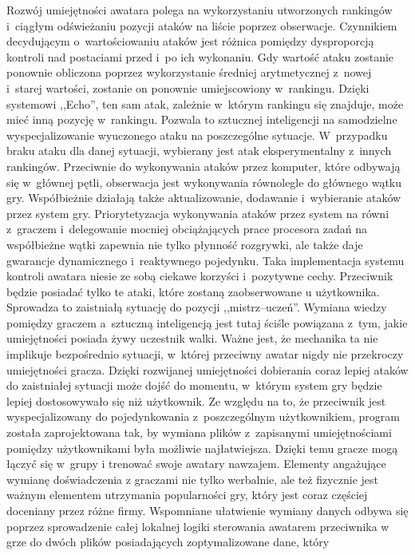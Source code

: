 \documentclass[brudnopis]{xmgr}
\begin{document}
Rozwój umiejętności awatara polega na wykorzystaniu utworzonych rankingów i~ciągłym
odświeżaniu pozycji ataków na liście poprzez obserwacje.
Czynnikiem decydującym o~wartościowaniu ataków jest różnica
pomiędzy dysproporcją kontroli nad postaciami przed i~po ich wykonaniu.
Gdy wartość ataku zostanie ponownie obliczona poprzez wykorzystanie
średniej arytmetycznej z~nowej i~starej wartości, zostanie on ponownie
umiejscowiony w~rankingu.
Dzięki systemowi ,,Echo'', ten sam atak, zależnie w~którym rankingu się
znajduje, może mieć inną pozycję w~rankingu. Pozwala to sztucznej
inteligencji na samodzielne wyspecjalizowanie wyuczonego ataku na
poszczególne sytuacje. W~przypadku braku ataku dla danej sytuacji,
wybierany jest atak eksperymentalny z~innych rankingów.
Przeciwnie do wykonywania ataków przez komputer, które odbywają się w~głównej
pętli, obserwacja jest wykonywania równolegle do głównego wątku gry.
Współbieżnie działają także aktualizowanie, dodawanie i~wybieranie ataków
przez system gry. Priorytetyzacja wykonywania ataków przez system
na równi z~graczem i~delegowanie mocniej obciążających prace procesora
zadań na współbieżne wątki zapewnia nie tylko płynność rozgrywki, ale
także daje gwarancje dynamicznego i~reaktywnego
pojedynku.
Taka implementacja systemu kontroli awatara niesie ze sobą ciekawe korzyści i~pozytywne cechy.
Przeciwnik będzie posiadać tylko te ataki, które zostaną zaobserwowane u użytkownika.
Sprowadza to zaistniałą sytuację do pozycji ,,mistrz--uczeń''. Wymiana
wiedzy pomiędzy graczem a~sztuczną inteligencją jest tutaj ściśle
powiązana z~tym, jakie umiejętności posiada żywy uczestnik walki. Ważne jest,
że mechanika ta nie implikuje bezpośrednio sytuacji, w~której przeciwny awatar nigdy nie
przekroczy umiejętności gracza. Dzięki rozwijanej umiejętności
dobierania coraz lepiej ataków do zaistniałej
sytuacji może dojść do momentu, w~którym system gry będzie lepiej
dostosowywało się niż użytkownik.
Ze względu na to, że przeciwnik jest wyspecjalizowany do
pojedynkowania z~poszczególnym użytkownikiem, program została zaprojektowana tak,
by wymiana plików z~zapisanymi umiejętnościami pomiędzy użytkownikami była
możliwie najłatwiejsza. Dzięki temu gracze mogą łączyć się w~grupy i
trenować swoje awatary nawzajem. Elementy angażujące wymianę doświadczenia z
graczami nie tylko werbalnie, ale też fizycznie jest ważnym elementem
utrzymania popularności gry, który jest coraz
częściej doceniany przez różne firmy. Wspomniane ułatwienie wymiany
danych odbywa się poprzez sprowadzenie całej lokalnej logiki sterowania awatarem przeciwnika w grze do dwóch
plików posiadających zoptymalizowane dane, który
\end{document}
